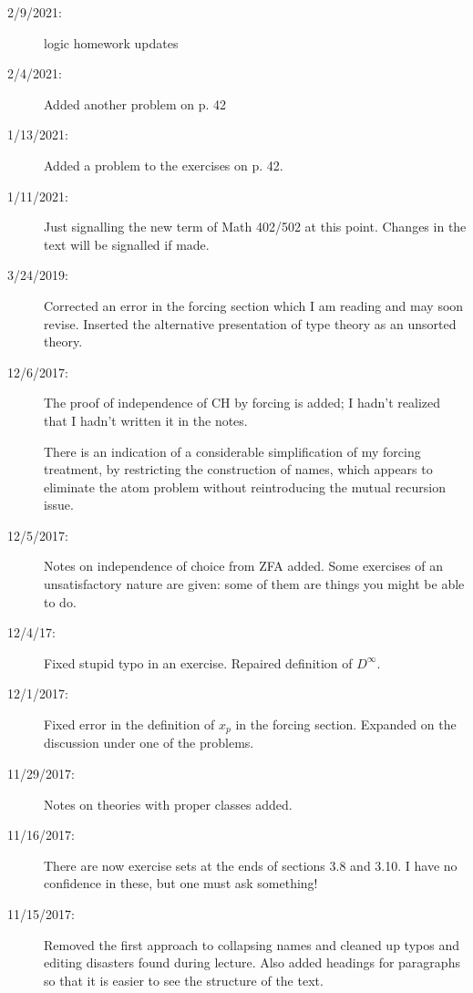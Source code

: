 \documentclass[12pt]{book}
\begin{document}
{\begin{description}
\item[2/9/2021:]  logic homework updates

\item[2/4/2021:]  Added another problem on p. 42

\item[1/13/2021:]  Added a problem to the exercises on p. 42.

\item[1/11/2021:]  Just signalling the new term of Math 402/502 at this point.  Changes in the text will be signalled if made.

\item[3/24/2019:]  Corrected an error in the forcing section which I am reading and may soon revise.  Inserted the alternative presentation of type theory as an unsorted theory.

\item[12/6/2017:]  The proof of independence of CH by forcing is added;  I hadn't realized that I hadn't written it in the notes.

There is an indication of a considerable simplification of my forcing treatment, by restricting the construction of names, which appears to eliminate the atom problem without reintroducing the mutual recursion issue.

\item[12/5/2017:]  Notes on independence of choice from ZFA added.  Some exercises of an unsatisfactory nature are given:  some of them are things you might be able to do.

\item[12/4/17:]  Fixed stupid typo in an exercise.  Repaired definition of $D^{\infty}$.

\item[12/1/2017:]  Fixed error in the definition of $x_p$ in the forcing section.  Expanded on the discussion under one of the problems.

\item[11/29/2017:]  Notes on theories with proper classes added.

\item[11/16/2017:]  There are now exercise sets at the ends of sections 3.8 and 3.10.  I have no confidence in these, but one must ask something!

\item[11/15/2017:]  Removed the first approach to collapsing names and cleaned up typos and editing disasters found during lecture.   Also added headings for paragraphs so that it is easier to see the structure of the text.


\end{description}}
\end{document}
